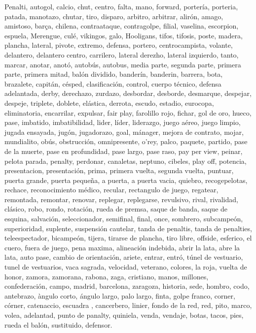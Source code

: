 \documentclass[../all.tex]{subfiles}
\begin{document}
    Penalti, autogol, calcio, chut, centro, falta, mano, forward, portería, porteria, patada, manotazo, chutar, tiro, disparo, arbitro, arbitrar, alirón, amago, amistoso, barça, chilena, contraataque, contragolpe, filial, vaselina, escorpion, espuela, Merengue, culé, vikingos, galo, Hooligans, tifos, tifosis, poste, madera, plancha, lateral, pivote, extremo, defensa, portero, centrocampista, volante, delantero, delantero centro, carrilero, lateral derezho, lateral izquierdo, tanto, marcar, anotar, anotó, autobús, autobus, media parte, segunda parte, primera parte, primera mitad, balón dividido, banderín, banderin, barrera, bota, brazalete, capitán, césped, clasificación, control, cuerpo técnico, defensa adelantada, derby, derechazo, zurdazo, desbordar, desborde, desmarque, despejar, despeje, triplete, doblete, elástica, derrota, escudo, estadio, eurocopa, eliminatoria, encarrilar, expulsar, fair play, farolillo rojo, fichar, gol de oro, hueco, pase, imbatido, imbatibilidad, lider, líder, liderazgo, juego aéreo, juego limpio, jugada ensayada, jugón, jugadorazo, goal, mánager, mejora de contrato, mojar, mundialito, obús, obstrucción, omnipresente, o'rey, palco, paquete, partido, pase de la muerte, pase en profundidad, pase largo, pase raso, pay per view, peinar, pelota parada, penalty, perdonar, canaletas, neptuno, cibeles, play off, potencia, presentacion, presentación, prima, primera vuelta, segunda vuelta, puntuar, puerta grande, puerta pequeña, a puerta, a puerta vacia, quiebro, recogepelotas, rechace, reconocimiento médico, recular, rectangulo de juego, regatear, remontada, remontar, renovar, replegar, replegarse, revulsivo, rival, rivalidad, clásico, robo, rondo, rotación, rueda de premsa, saque de banda, saque de esquina, salvación, seleccionador, semifinal, final, once, sombrero, subcampeón, superioridad, suplente, suspensión cautelar, tanda de penaltis, tanda de penalties, teleespectador, bicampeón, tijera, tirarse de plancha, tiro libre, offside, esferico, el cuero, fuera de juego, pena maxima, alineación indebida, abrir la lata, abre la lata, auto pase, cambio de orientación, ariete, entrar, entró, túnel de vestuario, tunel de vestuarios, vaca sagrada, velocidad, veterano, colores, la roja, vuelta de honor, zamora, zamorana, rabona, zaga, cristiano, manos, millones, confederación, campo, madrid, barcelona, zaragoza, historia, sede, hombro, codo, antebrazo, àngulo corto, ángulo largo, palo largo, finta, golpe franco, corner, córner, catenaccio, escuadra
, cancerbero, linier, fondo de la red, red, pito, marco, volea, adelantad, punto de panalty, quiniela, venda, vendaje, botas, tacos, pies, rueda el balón, sustituido, defensor.
\end{document}
